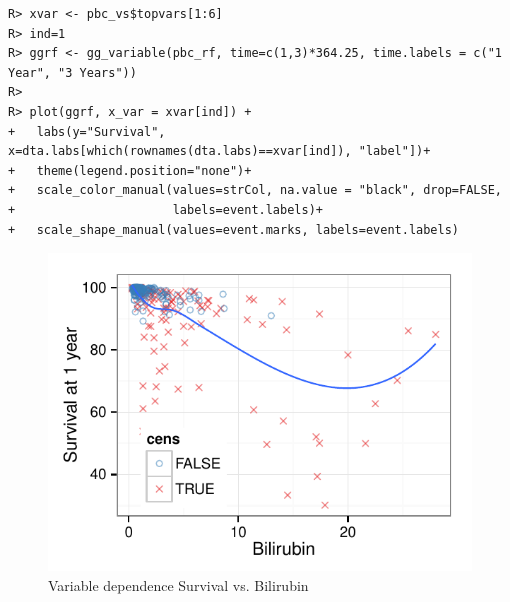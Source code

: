 \documentclass[nojss]{jss}\usepackage[]{graphicx}\usepackage[]{color}
\makeatletter
\def\maxwidth{ %
  \ifdim\Gin@nat@width>\linewidth
    \linewidth
  \else
    \Gin@nat@width
  \fi
}
\newenvironment{kframe}{%
 \def\at@end@of@kframe{}%
 \ifinner\ifhmode%
  \def\at@end@of@kframe{\end{minipage}}%
  \begin{minipage}{\columnwidth}%
 \fi\fi%
 \def\FrameCommand##1{\hskip\@totalleftmargin \hskip-\fboxsep
 \colorbox{shadecolor}{##1}\hskip-\fboxsep
     \hskip-\linewidth \hskip-\@totalleftmargin \hskip\columnwidth}%
 \MakeFramed {\advance\hsize-\width
   \@totalleftmargin\z@ \linewidth\hsize
   \@setminipage}}%
 {\par\unskip\endMakeFramed%
 \at@end@of@kframe}
\newenvironment{knitrout}{}{} %
\makeatother
\begin{document}
\begin{knitrout}\footnotesize
{}\color{fgcolor}\begin{kframe}
\begin{verbatim}
R> xvar <- pbc_vs$topvars[1:6]
R> ind=1
R> ggrf <- gg_variable(pbc_rf, time=c(1,3)*364.25, time.labels = c("1 Year", "3 Years"))
R> 
R> plot(ggrf, x_var = xvar[ind]) +
+   labs(y="Survival", x=dta.labs[which(rownames(dta.labs)==xvar[ind]), "label"])+
+   theme(legend.position="none")+
+   scale_color_manual(values=strCol, na.value = "black", drop=FALSE,
+                      labels=event.labels)+
+   scale_shape_manual(values=event.marks, labels=event.labels)
\end{verbatim}
\end{kframe}\begin{figure}[!htpb]

{\centering \includegraphics[width=\maxwidth]{figure/rfs-variable-plotbili-1} 

}

\caption[Variable dependence Survival vs]{Variable dependence Survival vs. Bilirubin\label{fig:variable-plotbili}}
\end{figure}


\end{knitrout}
\end{document}
